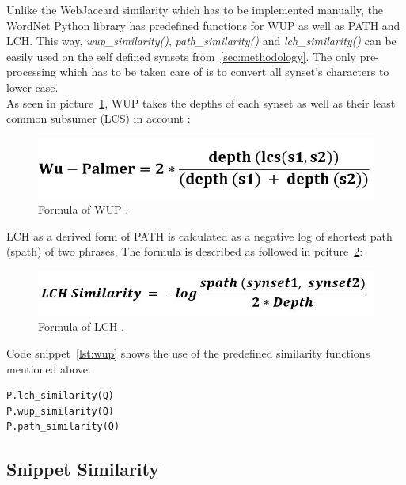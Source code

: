 \documentclass[conference]{IEEEtran}
\begin{document}
Unlike the WebJaccard similarity which has to be implemented manually, the WordNet Python library has predefined functions for WUP as well as PATH and LCH. This way, \textit{wup\_similarity()}, \textit{path\_similarity()} and \textit{lch\_similarity()} can be easily used on the self defined synsets from~\ref{sec:methodology}. The only pre-processing which has to be taken care of is to convert all synset's characters to lower case.\\
As seen in picture~\ref{fig:wupform}, WUP takes the depths of each synset as well as their least common subsumer (LCS) in account \cite{mohit}:

\begin{figure}[h]
\centerline{\includegraphics[scale=0.4]{img/wupalmer.jpg}}
\caption{Formula of WUP \cite{mohit}.}
\label{fig:wupform}
\end{figure}

LCH as a derived form of PATH is calculated as a negative log of shortest path (spath) of two phrases\cite{mohit}. The formula is described as followed in pciture~\ref{fig:lchform}:

\begin{figure}[h]
\centerline{\includegraphics[scale=0.4]{img/lch.jpg}}
\caption{Formula of LCH \cite{mohit}.}
\label{fig:lchform}
\end{figure}

Code snippet~\ref{lst:wup} shows the use of the predefined similarity functions mentioned above.

\begin{lstlisting}[frame=single, label=lst:wup, caption={Use of WUP, PATH and LCH}, captionpos=b]
P.lch_similarity(Q)
P.wup_similarity(Q)
P.path_similarity(Q)
\end{lstlisting}

\subsection{Snippet Similarity}\label{subsec:wup}
\end{document}
